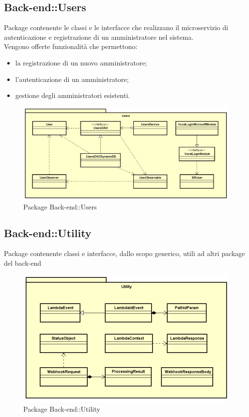 \subsection{Back-end::Users}
Package contenente le classi e le interfacce che realizzano il microservizio di autenticazione e registrazione di un amministratore nel sistema.\\ Vengono offerte funzionalità che permettono: \begin{itemize} \item la registrazione di un nuovo amministratore; \item l'autenticazione di un amministratore; \item gestione degli amministratori esistenti. \end{itemize}
\begin{figure}[h] \centering \includegraphics[width=\textwidth,height=\textheight,keepaspectratio]{images/diagrams/back-end/Official_Backend_0304/Users.png}
\caption{Package Back-end::Users}
\end{figure}
\newpage

\subsection{Back-end::Utility}
Package contenente classi e interfacce, dallo scopo generico, utili ad altri package del back-end
\begin{figure}[h] \centering \includegraphics[width=\textwidth,height=\textheight,keepaspectratio]{images/diagrams/back-end/Official_Backend_0304/Utility.png}
\caption{Package Back-end::Utility}
\end{figure}
\newpage

